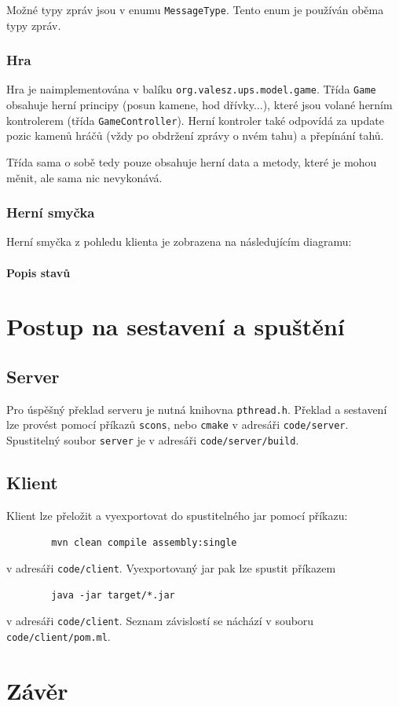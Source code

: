 \documentclass[11pt,a4paper]{scrartcl}
\begin{document}
	Možné typy zpráv jsou v enumu \verb|MessageType|. Tento enum je používán oběma typy zpráv.
	
	\subsubsection{Hra}
	Hra je naimplementována v balíku \verb|org.valesz.ups.model.game|. Třída \verb|Game| obsahuje herní principy (posun kamene, hod dřívky...), které jsou volané herním kontrolerem (třída \verb|GameController|). Herní kontroler také odpovídá za update pozic kamenů hráčů (vždy po obdržení zprávy o nvém tahu) a přepínání tahů.
	
	Třída sama o sobě tedy pouze obsahuje herní data a metody, které je mohou měnit, ale sama nic nevykonává.
	
		
	\subsubsection{Herní smyčka}
	Herní smyčka z pohledu klienta je zobrazena na následujícím diagramu:
	
	\paragraph{Popis stavů}
	

		
	\section{Postup na sestavení a spuštění}
	\subsection{Server}
	Pro úspěšný překlad serveru je nutná knihovna \verb|pthread.h|. Překlad a sestavení lze provést pomocí příkazů \verb|scons|, nebo \verb|cmake| v adresáři \verb|code/server|. Spustitelný soubor \verb|server| je v adresáři \verb|code/server/build|.
	\subsection{Klient}
	Klient lze přeložit a vyexportovat do spustitelného jar pomocí příkazu:
	\begin{lstlisting}
		mvn clean compile assembly:single
	\end{lstlisting}
	v adresáři \verb|code/client|. Vyexportovaný jar pak lze spustit příkazem
	\begin{lstlisting}
		java -jar target/*.jar
	\end{lstlisting} v adresáři \verb|code/client|. Seznam závislostí se náchází v souboru \verb|code/client/pom.ml|.
		
	\section{Závěr}
	
	
\end{document}
